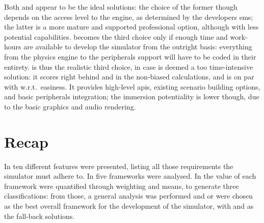 Both  and  appear to be the ideal solutions: the choice of the former though depends on the access level to the engine, as determined by the developers \gls{sms}; the latter is a more mature and supported professional option, although with less potential capabilities.  becomes the third choice only if enough time and work-hours are available to develop the simulator from the outright basis: everything from the physics engine to the peripherals support will have to be coded in their entirety.  is thus the realistic third choice, in case  is deemed a too time-intensive solution: it scores right behind  and  in the non-biased calculations, and is on par with  w.r.t.\ \gls{easiness}. It provides high-level \glspl{api}, existing scenario building options, and basic peripherals integration; the immersion potentiality is lower though, due to the basic graphics and audio rendering.

\section{Recap}\label{sc:feasibility:recap}

In  ten different \glspl{feature} were presented, listing all those requirements the simulator must adhere to. In  five \glspl{framework} were analysed. In  the value of each \gls{framework} were quantified through weighting and means, to generate three classifications: from those, a general analysis was performed and  or  were chosen as the best overall \gls{framework} for the development of the simulator, with  and  as the fall-back solutions.
